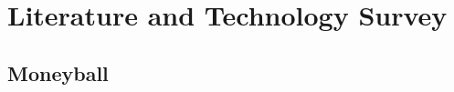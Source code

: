 \documentclass[12pt,a4paper]{report}
\theoremstyle{definition}
\begin{document}
%
%
%
%
%
%
%

\chapter{Literature and Technology Survey} \label{chap:LitReview}

\section{Moneyball}
\end{document}
